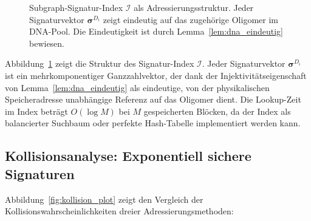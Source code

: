 ﻿\documentclass[a4paper,12pt]{article}
\theoremstyle{definition}
\theoremstyle{plain}
\begin{document}
\begin{figure}[H]
\centering
{}
\caption{Subgraph-Signatur-Index $\mathcal{I}$ als Adressierungsstruktur.
Jeder Signaturvektor $\boldsymbol{\sigma}^{D_i}$ zeigt eindeutig auf das
zugehörige Oligomer im DNA-Pool.  Die Eindeutigkeit ist durch
Lemma~\ref{lem:dna_eindeutig} bewiesen.}
\label{fig:sig_index}
\end{figure}

Abbildung~\ref{fig:sig_index} zeigt die Struktur des Signatur-Index
$\mathcal{I}$.  Jeder Signaturvektor $\boldsymbol{\sigma}^{D_i}$ ist ein
mehrkomponentiger Ganzzahlvektor, der dank der Injektivitätseigenschaft
von Lemma~\ref{lem:dna_eindeutig} als eindeutige, von der physikalischen
Speicheradresse unabhängige Referenz auf das Oligomer dient.
Die Lookup-Zeit im Index beträgt $O(\log M)$ bei $M$ gespeicherten Blöcken,
da der Index als balancierter Suchbaum oder perfekte Hash-Tabelle implementiert
werden kann.

\subsection{Kollisionsanalyse: Exponentiell sichere Signaturen}

Abbildung~\ref{fig:kollision_plot} zeigt den Vergleich der
Kollisionswahrscheinlichkeiten dreier Adressierungsmethoden:
\end{document}
